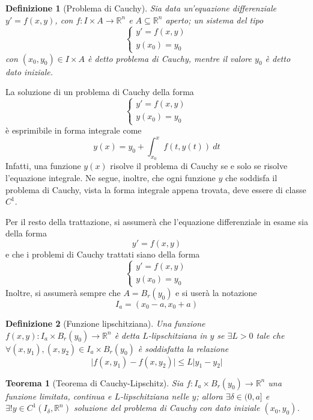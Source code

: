 \documentclass[12pt]{scrartcl}
\theoremstyle{style}
\newtheorem{definizione}{Definizione}[section]
\newtheorem{teorema}{Teorema}[section]
\newenvironment{boxenv}[1][]{
    \begin{eqbox}[#1]
    }{
   \end{eqbox}
}
\numberwithin{equation}{subsection}
\begin{document}
\begin{definizione}
	[Problema di Cauchy]
	Sia data un'equazione differenziale $y' = f(x,y)$, con $f : I \times A \to \mathbb{R}^n$ e $A \subseteq \mathbb{R}^n$ aperto; un sistema del tipo
	\[
	\begin{cases}
		y' = f(x,y)\\
		y(x_0) = y_0
	\end{cases}
	\] 
	con $(x_0,y_0) \in I \times A$ \`e detto \textit{problema di Cauchy}, mentre il valore $y_0$ \`e detto \textit{dato iniziale}.
\end{definizione}
\noindent La soluzione di un problema di Cauchy della forma
\[
\begin{cases}
	y' = f(x,y)\\
	y(x_0) = y_0
\end{cases}
\] 
\`e esprimibile in forma integrale come
\begin{equation}
	y(x) = y_0 + \int_{x_0} ^x f(t,y(t)) \ dt
\end{equation}
Infatti, una funzione $y(x)$ risolve il problema di Cauchy se e solo se risolve l'equazione integrale.
Ne segue, inoltre, che ogni funzione $y$ che soddisfa il problema di Cauchy, vista la forma integrale appena trovata, deve essere di classe $C^1$.
\begin{boxenv}[]
Per il resto della trattazione, si assumer\`a che l'equazione differenziale in esame sia della forma
\[
y'=f(x,y)
\] 
e che i problemi di Cauchy trattati siano della forma
\[
\begin{cases}
	y'  = f(x,y)\\
	y(x_0) = y_0
\end{cases}
\] 
Inoltre, si assumer\`a sempre che $A = B_r(y_0)$ e si user\`a la notazione
\[
I_a = (x_0-a,x_0+a)
\] 
\end{boxenv}
\begin{definizione}
		[Funzione lipschitziana]
		Una funzione $f(x,y) : I_a \times B_r(y_0)\to \mathbb{R}^n$ \`e detta \textit{$L$-lipschitziana} in $y$ se $\exists L>0$ tale che $\forall (x,y_1), (x,y_2) \in I_a \times B_r(y_0)$ \`e soddisfatta la relazione
		\[
		\lvert f(x,y_1) - f(x,y_2) \rvert \le L\lvert y_1-y_2 \rvert 
		\] 
\end{definizione}
\begin{teorema}
	[Teorema di Cauchy-Lipschitz]
	Sia $f : I_a \times B_r(y_0)\to \mathbb{R}^n$ una funzione limitata, continua e $L$-lipschitziana nelle $y$; allora $\exists \delta \in (0,a]$ e $\exists ! y \in C^1(I_\delta ,\mathbb{R}^n)$ soluzione del problema di Cauchy con dato iniziale $(x_0,y_0)$.
\end{teorema}
\end{document}
